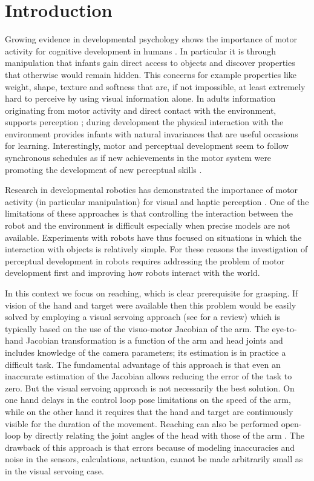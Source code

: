 \section{Introduction}
Growing evidence in developmental psychology shows the importance 
of motor activity for cognitive development in humans \cite{gallese06mirror}. 
In particular it is through manipulation that infants gain direct access to objects 
and discover properties that otherwise would remain hidden. 
This concerns for example properties like weight, shape, texture and 
softness that are, if not impossible, at least extremely hard to perceive 
by using visual information alone. In adults information originating 
from motor activity and direct contact with the environment, supports 
perception \cite{klatzky87hand}; during development
the physical interaction with the environment provides infants 
with natural invariances that are useful occasions for learning.
Interestingly, motor and perceptual development seem to follow synchronous  
schedules as if new achievements in the motor system were promoting
the development of new perceptual skills \cite{bushnell93motor}.

Research in developmental robotics has demonstrated the importance of
motor activity (in particular manipulation) for visual and haptic 
perception \cite{fitzpatrick07shared}. One of the 
limitations of these approaches is that controlling the interaction between
the robot and the environment is difficult especially when precise models are
not available. Experiments with robots have thus focused on situations
in which the interaction with objects is relatively simple. For these reasons
the investigation of perceptual development in robots requires addressing 
the problem of motor development first and improving how robots interact
with the world.

In this context we focus on reaching, which is clear prerequisite for 
grasping. If vision of the hand and target were available then this problem 
would be easily solved by employing a visual servoing approach (see 
\cite{hutchinson96tutorial} for a review) which is typically based on 
the use of the visuo-motor Jacobian of the arm. The eye-to-hand Jacobian 
transformation is a function of the arm and head joints and includes knowledge 
of the camera parameters; its estimation is in practice a difficult task.
The fundamental advantage of this approach is that even an inaccurate estimation 
of the Jacobian allows reducing the error of the task to zero. But the visual 
servoing approach is not necessarily the best solution. On one hand delays in 
the control loop pose limitations on the speed of the arm, while on the other 
hand it requires that the hand and target are continuously visible for the 
duration of the movement. 
Reaching can also be performed open-loop by directly relating the joint angles of 
the head with those of the arm \cite{blackburn94learning,metta99developmental}. 
The drawback of this approach is that errors because of modeling inaccuracies and 
noise in the sensors, calculations, actuation, cannot be made arbitrarily small 
as in the visual servoing case.

